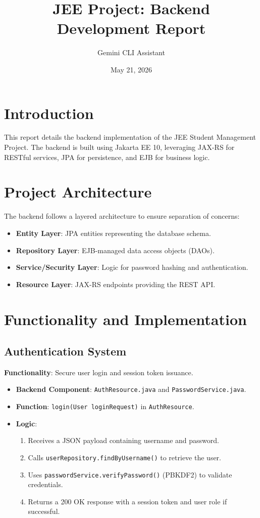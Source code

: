 \documentclass[12pt,a4paper]{article}
\title{JEE Project: Backend Development Report}
\author{Gemini CLI Assistant}
\date{May 21, 2026}
\begin{document}
\maketitle

\section{Introduction}
This report details the backend implementation of the JEE Student Management Project. The backend is built using Jakarta EE 10, leveraging JAX-RS for RESTful services, JPA for persistence, and EJB for business logic.

\section{Project Architecture}
The backend follows a layered architecture to ensure separation of concerns:
\begin{itemize}
    \item \textbf{Entity Layer}: JPA entities representing the database schema.
    \item \textbf{Repository Layer}: EJB-managed data access objects (DAOs).
    \item \textbf{Service/Security Layer}: Logic for password hashing and authentication.
    \item \textbf{Resource Layer}: JAX-RS endpoints providing the REST API.
\end{itemize}

\section{Functionality and Implementation}

\subsection{Authentication System}
\textbf{Functionality}: Secure user login and session token issuance.
\begin{itemize}
    \item \textbf{Backend Component}: \texttt{AuthResource.java} and \texttt{PasswordService.java}.
    \item \textbf{Function}: \texttt{login(User loginRequest)} in \texttt{AuthResource}.
    \item \textbf{Logic}:
    \begin{enumerate}
        \item Receives a JSON payload containing username and password.
        \item Calls \texttt{userRepository.findByUsername()} to retrieve the user.
        \item Uses \texttt{passwordService.verifyPassword()} (PBKDF2) to validate credentials.
        \item Returns a 200 OK response with a session token and user role if successful.
    \end{enumerate}
\end{itemize}
\end{document}
